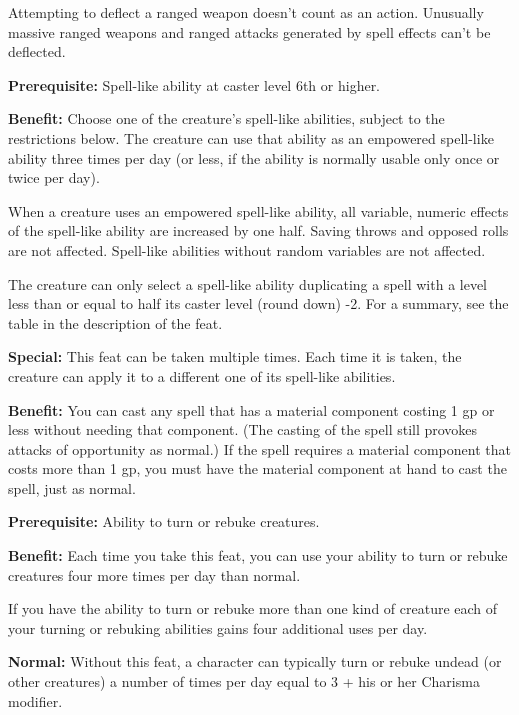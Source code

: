 Attempting to deflect a ranged weapon doesn't count as an action. Unusually massive ranged weapons and ranged attacks generated by spell effects can't be deflected.


\textbf{Prerequisite:} Spell-like ability at caster level 6th or higher.

\textbf{Benefit:} Choose one of the creature's spell-like abilities, subject to the restrictions below. The creature can use that ability as an empowered spell-like ability three times per day (or less, if the ability is normally usable only once or twice per day).

When a creature uses an empowered spell-like ability, all variable, numeric effects of the spell-like ability are increased by one half. Saving throws and opposed rolls are not affected. Spell-like abilities without random variables are not affected.

The creature can only select a spell-like ability duplicating a spell with a level less than or equal to half its caster level (round down) -2. For a summary, see the table in the description of the  feat. 

\textbf{Special:} This feat can be taken multiple times. Each time it is taken, the creature can apply it to a different one of its spell-like abilities.


\textbf{Benefit:} You can cast any spell that has a material component costing 1 gp or less without needing that component. (The casting of the spell still provokes attacks of opportunity as normal.) If the spell requires a material component that costs more than 1 gp, you must have the material component at hand to cast the spell, just as normal.


\textbf{Prerequisite:} Ability to turn or rebuke creatures.

\textbf{Benefit:} Each time you take this feat, you can use your ability to turn or rebuke creatures four more times per day than normal.

If you have the ability to turn or rebuke more than one kind of creature each of your turning or rebuking abilities gains four additional uses per day.

\textbf{Normal:} Without this feat, a character can typically turn or rebuke undead (or other creatures) a number of times per day equal to 3 + his or her Charisma modifier.

